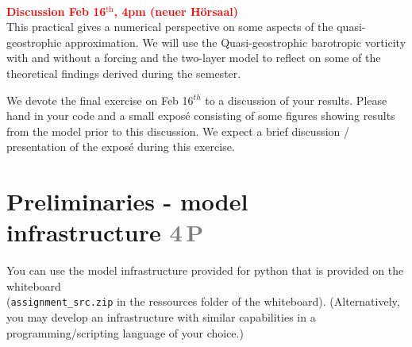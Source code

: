 \documentclass[jobname=project, 10pt]{article}
\newcommand{\task}[2]{\section{#1 \hfill \normalsize\normalfont \textcolor{gray}{#2\,P}}\addtocounter{ptot}{#2}}
\newcounter{ptot}
\begin{document}
~\\[-3em]
\phantom{AA}\hfill \textcolor{red}{\textbf{Discussion Feb 16$^\mathrm{th}$, 4pm (neuer H\"orsaal)}} \\
This practical gives a numerical perspective on some aspects of the quasi-geostrophic approximation.
We will use the Quasi-geostrophic barotropic vorticity with and without a forcing and the two-layer model
to reflect on some of the theoretical findings derived during the semester.
%
\par
% 
We devote the final exercise on Feb 16$^{th}$ to a discussion of your results. Please hand in your code and a small expos\'e consisting of some figures showing results from the model prior to this discussion. We expect a brief discussion / presentation of the expos\'e during this exercise. 

\task{Preliminaries - model infrastructure}{4}

You can use the model infrastructure provided for python that is provided on the whiteboard \\(\texttt{assignment\_src.zip} in the ressources folder of the whiteboard). (Alternatively, you may develop an infrastructure with similar capabilities in a programming/scripting language of your choice.) \\
\end{document}
